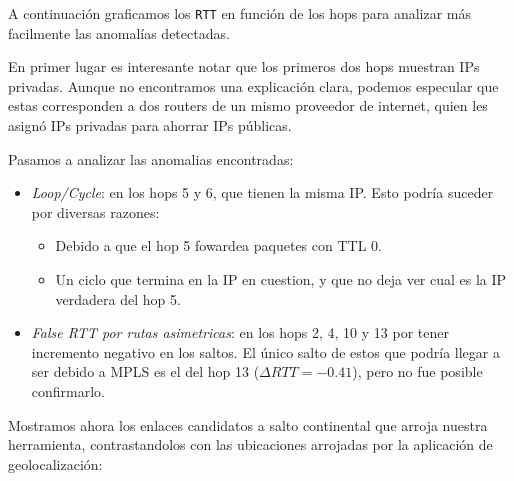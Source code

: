 A continuación graficamos los \texttt{RTT} en función de los hops para analizar más facilmente las anomalías detectadas.

\begin{figure}[H]
    \centering
\end{figure}

En primer lugar es interesante notar que los primeros dos hops muestran IPs privadas. Aunque no encontramos una explicación clara, podemos especular que estas corresponden a dos routers de un mismo proveedor de internet, quien les asignó IPs privadas para ahorrar IPs públicas.

Pasamos a analizar las anomalias encontradas:

\begin{itemize}
  \item \textit{Loop/Cycle}: en los hops 5 y 6, que tienen la misma IP. Esto podría suceder por diversas razones:
      \begin{itemize}
        \item Debido a que el hop 5 fowardea paquetes con TTL 0.
        \item Un ciclo que termina en la IP en cuestion, y que no deja ver cual es la IP verdadera del hop 5.
      \end{itemize}
  \item \textit{False RTT por rutas asimetricas}: en los hops 2, 4, 10 y 13 por tener incremento negativo en los saltos. El único salto de estos que podría llegar a ser debido a MPLS es el del hop 13 ($\Delta RTT = -0.41$), pero no fue posible confirmarlo.
\end{itemize}

Mostramos ahora los enlaces candidatos a salto continental que arroja nuestra herramienta, contrastandolos con las ubicaciones arrojadas por la aplicación de geolocalización:

